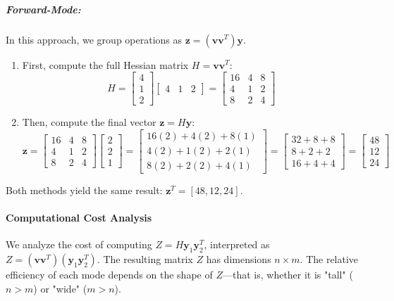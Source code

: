 \documentclass{article}
\begin{document}
\subparagraph{Forward-Mode:} In this approach, we group operations as $\mathbf{z} = (\mathbf{v}\mathbf{v}^T)\mathbf{y}$.
\begin{enumerate}
    \item First, compute the full Hessian matrix $H = \mathbf{v}\mathbf{v}^T$:
    \[ H = \begin{bmatrix} 4 \\ 1 \\ 2 \end{bmatrix} \begin{bmatrix} 4 & 1 & 2 \end{bmatrix} = \begin{bmatrix} 16 & 4 & 8 \\ 4 & 1 & 2 \\ 8 & 2 & 4 \end{bmatrix} \]
    \item Then, compute the final vector $\mathbf{z} = H\mathbf{y}$:
    \[ \mathbf{z} = \begin{bmatrix} 16 & 4 & 8 \\ 4 & 1 & 2 \\ 8 & 2 & 4 \end{bmatrix} \begin{bmatrix} 2 \\ 2 \\ 1 \end{bmatrix} = \begin{bmatrix} 16(2)+4(2)+8(1) \\ 4(2)+1(2)+2(1) \\ 8(2)+2(2)+4(1) \end{bmatrix} = \begin{bmatrix} 32+8+8 \\ 8+2+2 \\ 16+4+4 \end{bmatrix} = \begin{bmatrix} 48 \\ 12 \\ 24 \end{bmatrix} \]
\end{enumerate}
Both methods yield the same result: $\mathbf{z}^T = [48, 12, 24]$.

\paragraph{Computational Cost Analysis}
We analyze the cost of computing $Z = H\mathbf{y}_1\mathbf{y}_2^T$, interpreted as $Z = (\mathbf{v}\mathbf{v}^T)(\mathbf{y}_1\mathbf{y}_2^T)$. The resulting matrix $Z$ has dimensions $n \times m$. The relative efficiency of each mode depends on the shape of $Z$---that is, whether it is "tall" ($n > m$) or "wide" ($m > n$).
\end{document}
